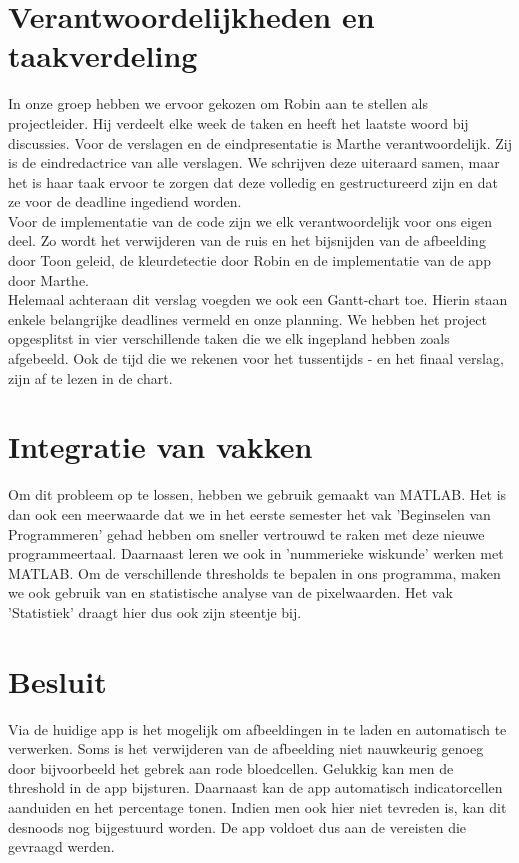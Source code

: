 \documentclass[a4paper,kulak]{kulakarticle}
\begin{document}
\section{Verantwoordelijkheden en taakverdeling}		
In onze groep hebben we ervoor gekozen om Robin aan te stellen als projectleider. Hij verdeelt elke week de taken en heeft het laatste woord bij discussies. 
Voor de verslagen en de eindpresentatie is Marthe verantwoordelijk. Zij is de eindredactrice van alle verslagen. We schrijven deze uiteraard samen, maar het is haar taak ervoor te zorgen dat deze volledig en gestructureerd zijn en dat ze voor de deadline ingediend worden.\\
Voor de implementatie van de code zijn we elk verantwoordelijk voor ons eigen deel. Zo wordt het verwijderen van de ruis en het bijsnijden van de afbeelding door Toon geleid, de kleurdetectie door Robin en de implementatie van de app door Marthe.\\
Helemaal achteraan dit verslag voegden we ook een Gantt-chart toe. Hierin staan enkele belangrijke deadlines vermeld en onze planning. We hebben het project opgesplitst in vier verschillende taken die we elk ingepland hebben zoals afgebeeld. Ook de tijd die we rekenen voor het tussentijds - en het finaal verslag, zijn af te lezen in de chart.

\section{Integratie van vakken}
Om dit probleem op te lossen, hebben we gebruik gemaakt van MATLAB. Het is dan ook een meerwaarde dat we in het eerste semester het vak 'Beginselen van Programmeren' gehad hebben om sneller vertrouwd te raken met deze nieuwe programmeertaal. Daarnaast leren we ook in 'nummerieke wiskunde' werken met MATLAB. Om de verschillende thresholds te bepalen in ons programma, maken we ook gebruik van en statistische analyse van de pixelwaarden. Het vak 'Statistiek' draagt hier dus ook zijn steentje bij.

\section{Besluit}
Via de huidige app is het mogelijk om afbeeldingen in te laden en automatisch te verwerken. Soms is het verwijderen van de afbeelding niet nauwkeurig genoeg door bijvoorbeeld het gebrek aan rode bloedcellen. Gelukkig kan men de threshold in de app bijsturen. Daarnaast kan de app automatisch indicatorcellen aanduiden en het percentage tonen. Indien men ook hier niet tevreden is, kan dit desnoods nog bijgestuurd worden. De app voldoet dus aan de vereisten die gevraagd werden.

\newpage




\end{document}
